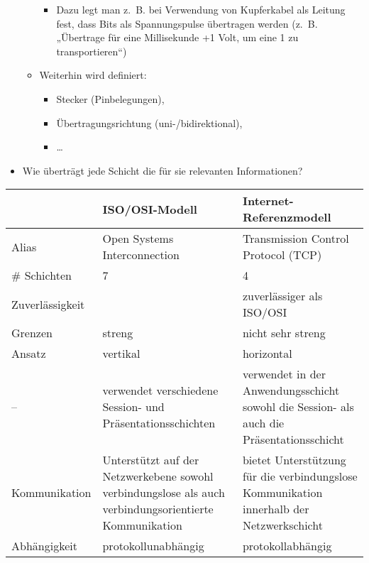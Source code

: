 \begin{itemize}
\begin{itemize}
        \begin{itemize}
            \item Dazu legt man z.\ B. bei Verwendung von Kupferkabel als Leitung fest, dass Bits als Spannungspulse übertragen werden (z.\ B. „Übertrage für eine Millisekunde +1 Volt, um eine 1 zu transportieren“)
        \end{itemize}
        \item Weiterhin wird definiert:
        \begin{itemize}
            \item Stecker (Pinbelegungen),
            \item Übertragungsrichtung (uni-/bidirektional),
            \item \ldots
        \end{itemize}
    \end{itemize}
\end{itemize}

\begin{itemize}
    \item {} Wie überträgt jede Schicht die für sie relevanten Informationen?
\end{itemize}

\bigbreak
\begin{tabularx}{\textwidth}{|X|X|X|}
    \hline
    & ISO/OSI-Modell & Internet-Referenzmodell \tabularnewline
    \hline
    Alias & Open Systems Interconnection & Transmission Control Protocol (TCP) \tabularnewline
    \hline
    \# Schichten & 7 & 4 \tabularnewline
    \hline
    Zuverlässigkeit & & zuverlässiger als ISO/OSI \tabularnewline
    \hline
    Grenzen & streng & nicht sehr streng \tabularnewline
    \hline
    Ansatz & vertikal & horizontal \tabularnewline
    \hline
    – & verwendet verschiedene Session- und Präsentationsschichten & verwendet in der Anwendungsschicht sowohl die Session- als auch die Präsentationsschicht \tabularnewline
    \hline
    Kommunikation & Unterstützt auf der Netzwerkebene sowohl verbindungslose als auch verbindungsorientierte Kommunikation & bietet Unterstützung für die verbindungslose Kommunikation innerhalb der Netzwerkschicht \tabularnewline
    \hline
    Abhängigkeit & protokollunabhängig & protokollabhängig \tabularnewline
    \hline
\end{tabularx}


